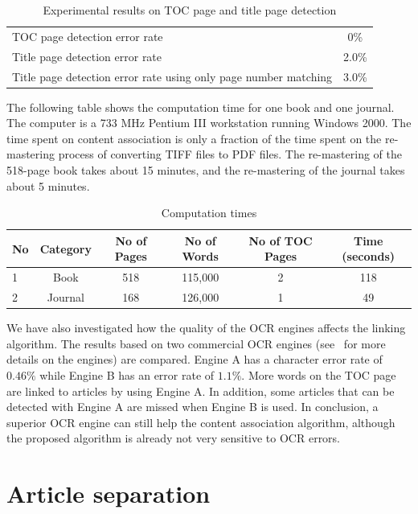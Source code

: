 \documentclass[10pt]{article}
\begin{document}
\begin{table}[htbp]
\centering
\caption{Experimental results on TOC page and title page detection}
\label{tab:2}
\begin{tabular}{|l|c|}
\hline
TOC page detection error rate & 0\% \\
Title page detection error rate & 2.0\% \\
Title page detection error rate using only page number matching & 3.0\% \\
\hline
\end{tabular}
\end{table}

The following table shows the computation time for one book and one journal. The computer is a 733 MHz Pentium III workstation running Windows 2000. The time spent on content association is only a fraction of the time spent on the re-mastering process of converting TIFF files to PDF files. The re-mastering of the 518-page book takes about 15 minutes, and the re-mastering of the journal takes about 5 minutes.

\begin{table}[htbp]
\centering
\caption{Computation times}
\label{tab:3}
\begin{tabular}{|l|c|c|c|c|c|}
\hline
No & Category & No of Pages & No of Words & No of TOC Pages & Time (seconds) \\
\hline
1 & Book & 518 & 115,000 & 2 & 118 \\
2 & Journal & 168 & 126,000 & 1 & 49 \\
\hline
\end{tabular}
\end{table}

We have also investigated how the quality of the OCR engines affects the linking algorithm. The results based on two commercial OCR engines (see~\cite{Lin2002} for more details on the engines) are compared. Engine A has a character error rate of \(0.46\%\) while Engine B has an error rate of \(1.1\%\). More words on the TOC page are linked to articles by using Engine A. In addition, some articles that can be detected with Engine A are missed when Engine B is used. In conclusion, a superior OCR engine can still help the content association algorithm, although the proposed algorithm is already not very sensitive to OCR errors.

\section{Article separation}
\label{sec:separation}
\end{document}
